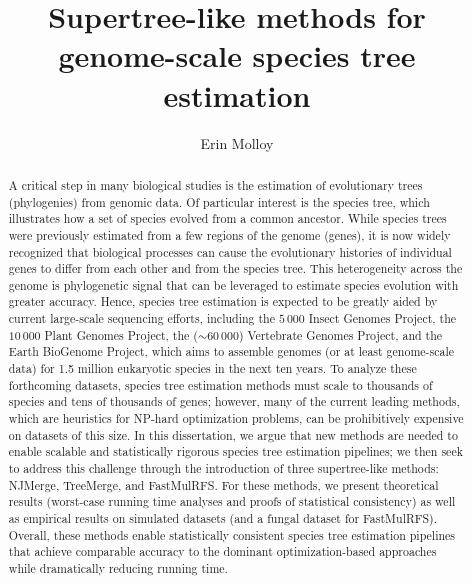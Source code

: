 \documentclass[tocnosub, noragright, centerchapter, fullpagesingle, 12pt]{uiuc_csthesis18}
\title{Supertree-like methods for genome-scale species tree estimation}
\author{Erin Molloy}
\theoremstyle{definition}
\numberwithin{algocf}{chapter}     %
\begin{document}
%

%
\maketitle


\frontmatter

%
\begin{abstract}
A critical step in many biological studies is the estimation of evolutionary trees (phylogenies) from genomic data.
Of particular interest is the species tree, which illustrates how a set of species evolved from a common ancestor.
While species trees were previously estimated from a few regions of the genome (genes), it is now widely recognized that biological processes can cause the evolutionary histories of individual genes to differ from each other and from the species tree.
This heterogeneity across the genome is phylogenetic signal that can be leveraged to estimate species evolution with greater accuracy.
Hence, species tree estimation is expected to be greatly aided by current large-scale sequencing efforts, including the $5\,000$ Insect Genomes Project, the $10\,000$ Plant Genomes Project, the ($\sim$$60\,000$) Vertebrate Genomes Project, and the Earth BioGenome Project, which aims to assemble genomes (or at least genome-scale data) for 1.5 million eukaryotic species in the next ten years.
To analyze these forthcoming datasets, species tree estimation methods must scale to thousands of species and tens of thousands of genes; however, many of the current leading methods, which are heuristics for NP-hard optimization problems, can be prohibitively expensive on datasets of this size.
In this dissertation, we argue that new methods are needed to enable scalable and statistically rigorous species tree estimation pipelines; we then seek to address this challenge through the introduction of three supertree-like methods: NJMerge, TreeMerge, and FastMulRFS. 
For these methods, we present theoretical results (worst-case running time analyses and proofs of statistical consistency) as well as empirical results on simulated  datasets (and a fungal dataset for FastMulRFS).
Overall, these methods enable statistically consistent species tree estimation pipelines  that achieve comparable accuracy to the dominant optimization-based approaches while dramatically reducing running time.
\end{abstract}
\end{document}
